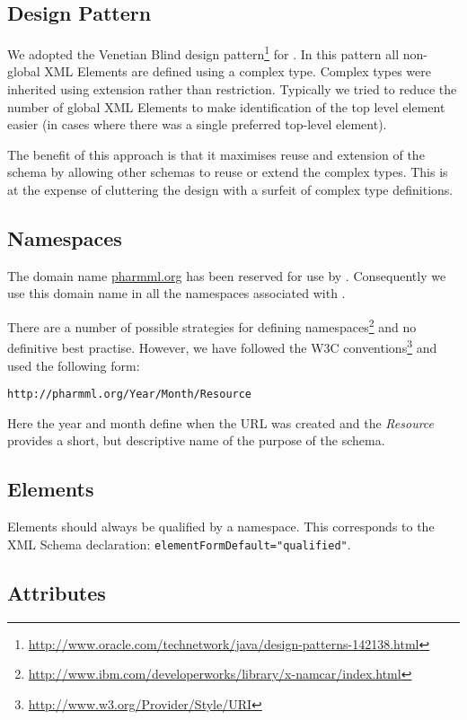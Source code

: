 \subsection{Design Pattern}

We adopted the Venetian Blind design
pattern\footnote{\url{http://www.oracle.com/technetwork/java/design-patterns-142138.html}}
for \pharmml. In this pattern all non-global XML Elements are
defined using a complex type. Complex types were inherited using
extension rather than restriction. Typically we tried to reduce the
number of global XML Elements to make identification of the top level
element easier (in cases where there was a single preferred top-level
element).

The benefit of this approach is that it maximises reuse and extension
of the schema by allowing other schemas to reuse or extend the complex
types. This is at the expense of cluttering the design with a surfeit
of complex type definitions.

\subsection{Namespaces}

The domain name \url{pharmml.org} has been reserved for use by
\pharmml. Consequently we use this domain name in all the namespaces
associated with \pharmml.

There are a number of possible strategies for defining
namespaces\footnote{\url{http://www.ibm.com/developerworks/library/x-namcar/index.html}}
and no definitive best practise. However, we have followed the W3C
conventions\footnote{\url{http://www.w3.org/Provider/Style/URI}} and
used the following form:
\begin{verbatim}
http://pharmml.org/Year/Month/Resource
\end{verbatim}
Here the year and month define when the URL was created and the
\emph{Resource} provides a short, but descriptive name of the purpose
of the schema.

\subsection{Elements}

Elements should always be qualified by a namespace. This corresponds
to the XML Schema declaration: \verb|elementFormDefault="qualified"|.

\subsection{Attributes}


